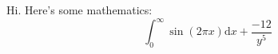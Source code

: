 \documentclass{bsteffan-exsheet}
\author{Ben Steffan}
\begin{document}
\maketitle
Hi. Here's some mathematics:
\[
	\int_0^\infty \sin(2\pi x) \mathrm{d}x + \frac{-12}{y^5}
\]
\end{document}
